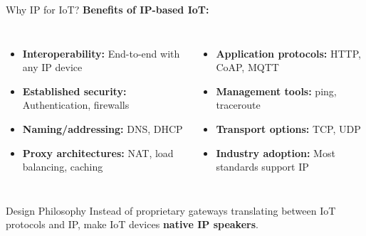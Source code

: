 \documentclass[aspectratio=169,11pt]{beamer}
\begin{document}
\begin{frame}{Why IP for IoT?}
    \textbf{Benefits of IP-based IoT:}
    
    \vspace{0.3cm}
    \begin{columns}
        \begin{itemize}
            \item \textbf{Interoperability:} End-to-end with any IP device
            \item \textbf{Established security:} Authentication, firewalls
            \item \textbf{Naming/addressing:} DNS, DHCP
            \item \textbf{Proxy architectures:} NAT, load balancing, caching
        \end{itemize}
        
        \begin{itemize}
            \item \textbf{Application protocols:} HTTP, CoAP, MQTT
            \item \textbf{Management tools:} ping, traceroute
            \item \textbf{Transport options:} TCP, UDP
            \item \textbf{Industry adoption:} Most standards support IP
        \end{itemize}
    \end{columns}
    
    \vspace{0.3cm}
    \begin{alertblock}{Design Philosophy}
        Instead of proprietary gateways translating between IoT protocols and IP, make IoT devices \textbf{native IP speakers}.
    \end{alertblock}
\end{frame}
\end{document}
